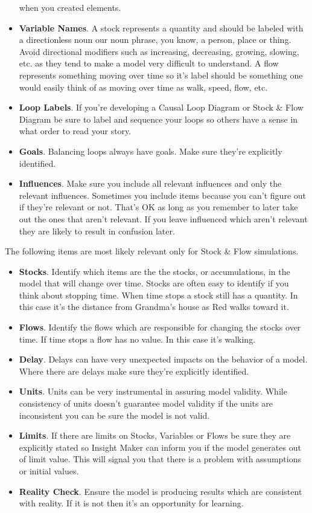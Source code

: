 \documentclass[]{memoir}
\begin{document}
\begin{itemize}
  when you created elements.
\item
  \textbf{Variable Names}. A stock represents a quantity and should be
  labeled with a directionless noun our noun phrase, you know, a person,
  place or thing. Avoid directional modifiers such as increasing,
  decreasing, growing, slowing, etc. as they tend to make a model very
  difficult to understand. A flow represents something moving over time
  so it's label should be something one would easily think of as moving
  over time as walk, speed, flow, etc.
\item
  \textbf{Loop Labels}. If you're developing a Causal Loop Diagram or
  Stock \& Flow Diagram be sure to label and sequence your loops so
  others have a sense in what order to read your story.
\item
  \textbf{Goals}. Balancing loops always have goals. Make sure they're
  explicitly identified.
\item
  \textbf{Influences}. Make sure you include all relevant influences and
  only the relevant influences. Sometimes you include items because you
  can't figure out if they're relevant or not. That's OK as long as you
  remember to later take out the ones that aren't relevant. If you leave
  influenced which aren't relevant they are likely to result in
  confusion later.
\end{itemize}

The following items are most likely relevant only for Stock \& Flow
simulations.

\begin{itemize}
\itemsep1pt\parskip0pt
\item
  \textbf{Stocks}. Identify which items are the the stocks, or
  accumulations, in the model that will change over time. Stocks are
  often easy to identify if you think about stopping time. When time
  stops a stock still has a quantity. In this case it's the distance
  from Grandma's house as Red walks toward it.
\item
  \textbf{Flows}. Identify the flows which are responsible for changing
  the stocks over time. If time stops a flow has no value. In this case
  it's walking.
\item
  \textbf{Delay}. Delays can have very unexpected impacts on the
  behavior of a model. Where there are delays make sure they're
  explicitly identified.
\item
  \textbf{Units}. Units can be very instrumental in assuring model
  validity. While consistency of units doesn't guarantee model validity
  if the units are inconsistent you can be sure the model is not valid.
\item
  \textbf{Limits}. If there are limits on Stocks, Variables or Flows be
  sure they are explicitly stated so Insight Maker can inform you if the
  model generates out of limit value. This will signal you that there is
  a problem with assumptions or initial values.
\item
  \textbf{Reality Check}. Ensure the model is producing results which
  are consistent with reality. If it is not then it's an opportunity for
  learning.
\end{itemize}
\end{document}
